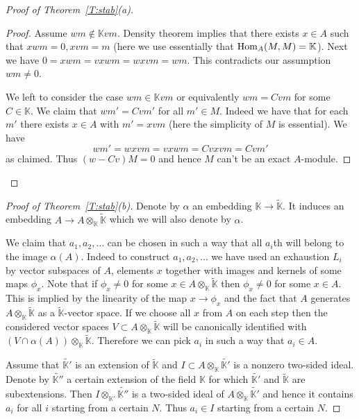 \documentclass{amsart} \textwidth=18.0cm \oddsidemargin=-1cm \evensidemargin=-1cm \topmargin=-1cm \textheight=23cm
\theoremstyle{definition}
\begin{document}
\begin{proof}[Proof of Theorem~\ref{T:stab}(a)]
\begin{proof}
Assume $wm\notin\mathbb Kvm$. 
Density theorem implies that there exists $x\in A$ such that $xwm=0, xvm=m$ (here we use essentially that ${\rm Hom}_A(M, M)=\mathbb K$). 
Next we have $0=xwm=vxwm=wxvm=wm$. 
This contradicts our assumption $wm\ne0$. 

We left to consider the case $wm\in\mathbb Kvm$ or equivalently $wm=Cvm$ for some $C\in\mathbb K$. 
We claim that $wm'=Cvm'$ for all $m'\in M$. 
Indeed we have that for each $m'$ there exists $x\in A$ with $m'=xvm$ (here the simplicity of $M$ is essential). 
We have
$$wm'=wxvm=vxwm=Cvxvm=Cvm'$$
as claimed. 
Thus $(w-Cv)M=0$ and hence $M$ can't be an exact $A$-module.
\end{proof}
\end{proof}
\begin{proof}[Proof of Theorem~\ref{T:stab}(b)]
Denote by $\alpha$ an embedding $\mathbb K\to\widetilde{\mathbb K}$. 
It induces an embedding $A\to A\otimes_{\mathbb K}\widetilde{\mathbb K}$ which we will also denote by $\alpha$.

We claim that $a_1, a_2, \ldots$ can be chosen in such a way that all $a_i$th will belong to the image $\alpha(A)$. Indeed to construct $a_1, a_2, \ldots$ we have used an exhaustion $L_i$ by vector subspaces of $A$, elements $x$ together with images and kernels of some maps $\phi_x$. 
Note that if $\phi_x\ne 0$ for some $x\in A\otimes_{\mathbb K}\widetilde{\mathbb K}$ then $\phi_x\ne 0$ for some $x\in A$. 
This is implied by the linearity of the map $x\to \phi_x$ and the fact that $A$ generates $A\otimes_{\mathbb K}\widetilde{\mathbb K}$ as a  $\widetilde{\mathbb K}$-vector space. 
If we choose all $x$ from $A$ on each step then the considered vector spaces $V\subset A\otimes_{\mathbb K}\widetilde{\mathbb K}$ will be canonically identified with $(V\cap\alpha(A))\otimes_{\mathbb K}\widetilde{\mathbb K}$. 
Therefore we can pick $a_i$ in such a way that $a_i\in A$. 

Assume that $\widetilde{\mathbb K'}$ is an extension of $\widetilde{\mathbb K}$ and $I\subset A\otimes_{\mathbb K}\widetilde{\mathbb K'}$ is a nonzero two-sided ideal. 
Denote by $\widetilde{\mathbb K''}$ a certain extension of the field $\mathbb K$ for which $\widetilde{\mathbb K'}$ and $\widetilde{\mathbb K}$ are subextensions.  
Then $I\otimes_{\mathbb K'}\widetilde{\mathbb K''}$ is a two-sided ideal of $A\otimes_{\mathbb K}\widetilde{\mathbb K'}$ and hence it contains $a_i$ for all $i$ starting from a certain $N$. 
Thus $a_i\in I$ starting from a certain $N$.
\end{proof}
\end{document}
